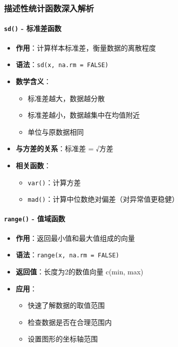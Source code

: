 \documentclass[
  twoside]{book}
\providecommand{\tightlist}{%
  \setlength{\itemsep}{0pt}\setlength{\parskip}{0pt}}
\begin{document}
\hypertarget{ux63cfux8ff0ux6027ux7edfux8ba1ux51fdux6570ux6df1ux5165ux89e3ux6790}{%
\subsubsection{描述性统计函数深入解析}\label{ux63cfux8ff0ux6027ux7edfux8ba1ux51fdux6570ux6df1ux5165ux89e3ux6790}}

\hypertarget{sd---ux6807ux51c6ux5deeux51fdux6570}{%
\paragraph{\texorpdfstring{\texttt{sd()} - 标准差函数}{sd() - 标准差函数}}\label{sd---ux6807ux51c6ux5deeux51fdux6570}}

\begin{itemize}
\tightlist
\item
  \textbf{作用}：计算样本标准差，衡量数据的离散程度
\item
  \textbf{语法}：\texttt{sd(x,\ na.rm\ =\ FALSE)}
\item
  \textbf{数学含义}：

  \begin{itemize}
  \tightlist
  \item
    标准差越大，数据越分散
  \item
    标准差越小，数据越集中在均值附近
  \item
    单位与原数据相同
  \end{itemize}
\item
  \textbf{与方差的关系}：标准差 = √方差
\item
  \textbf{相关函数}：

  \begin{itemize}
  \tightlist
  \item
    \texttt{var()}：计算方差
  \item
    \texttt{mad()}：计算中位数绝对偏差（对异常值更稳健）
  \end{itemize}
\end{itemize}

\hypertarget{range---ux503cux57dfux51fdux6570}{%
\paragraph{\texorpdfstring{\texttt{range()} - 值域函数}{range() - 值域函数}}\label{range---ux503cux57dfux51fdux6570}}

\begin{itemize}
\tightlist
\item
  \textbf{作用}：返回最小值和最大值组成的向量
\item
  \textbf{语法}：\texttt{range(x,\ na.rm\ =\ FALSE)}
\item
  \textbf{返回值}：长度为2的数值向量 c(min, max)
\item
  \textbf{应用}：

  \begin{itemize}
  \tightlist
  \item
    快速了解数据的取值范围
  \item
    检查数据是否在合理范围内
  \item
    设置图形的坐标轴范围
  \end{itemize}
\end{itemize}
\end{document}

